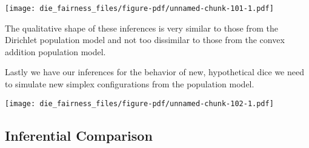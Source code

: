 \documentclass[
  letterpaper,
  DIV=11,
  numbers=noendperiod]{scrartcl}
\newenvironment{Shaded}{\begin{snugshade}}{\end{snugshade}}
\newcommand{\AttributeTok}[1]{\textcolor[rgb]{0.40,0.45,0.13}{#1}}
\newcommand{\ControlFlowTok}[1]{\textcolor[rgb]{0.00,0.23,0.31}{#1}}
\newcommand{\DecValTok}[1]{\textcolor[rgb]{0.68,0.00,0.00}{#1}}
\newcommand{\FloatTok}[1]{\textcolor[rgb]{0.68,0.00,0.00}{#1}}
\newcommand{\FunctionTok}[1]{\textcolor[rgb]{0.28,0.35,0.67}{#1}}
\newcommand{\NormalTok}[1]{\textcolor[rgb]{0.00,0.23,0.31}{#1}}
\newcommand{\OtherTok}[1]{\textcolor[rgb]{0.00,0.23,0.31}{#1}}
\newcommand{\SpecialCharTok}[1]{\textcolor[rgb]{0.37,0.37,0.37}{#1}}
\newcommand{\StringTok}[1]{\textcolor[rgb]{0.13,0.47,0.30}{#1}}
\begin{document}
\texttt{[image: die\_fairness\_files/figure-pdf/unnamed-chunk-101-1.pdf]}

The qualitative shape of these inferences is very similar to those from
the Dirichlet population model and not too dissimilar to those from the
convex addition population model.

Lastly we have our inferences for the behavior of new, hypothetical dice
we need to simulate new simplex configurations from the population
model.

\begin{Shaded}
\end{Shaded}

\texttt{[image: die\_fairness\_files/figure-pdf/unnamed-chunk-102-1.pdf]}

\subsection{Inferential Comparison}\label{inferential-comparison}
\end{document}
